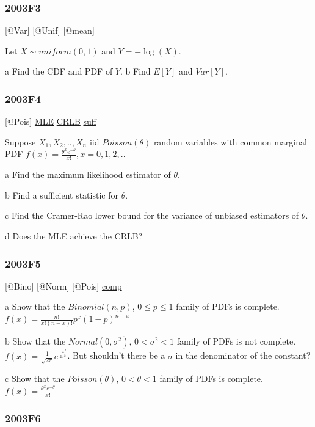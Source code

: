 \documentclass[10pt,twocolumn,portrait]{article}
\begin{document}
\hypertarget{f3-1}{%
\subsubsection{2003F3}\label{f3-1}}

{[}@Var{]} {[}@Unif{]} {[}@mean{]}

Let \(X\sim uniform(0,1)\) and \(Y=-\log(X)\).

a Find the CDF and PDF of \(Y\). b Find \(E[Y]\) and \(Var[Y]\).

\hypertarget{f4-1}{%
\subsubsection{2003F4}\label{f4-1}}

{[}@Pois{]} \protect\hyperlink{MLE}{MLE}
\protect\hyperlink{section-5}{CRLB} \protect\hyperlink{section-6}{suff}

Suppose \(X_1,X_2,..,X_n\) iid \(Poisson(\theta)\) random variables with
common marginal PDF \(f(x)=\frac{\theta^xe^{-\theta}}{x!},x=0,1,2,..\)

a Find the maximum likelihood estimator of \(\theta\).

b Find a sufficient statistic for \(\theta\).

c Find the Cramer-Rao lower bound for the variance of unbiased
estimators of \(\theta\).

d Does the MLE achieve the CRLB?

\hypertarget{f5-1}{%
\subsubsection{2003F5}\label{f5-1}}

{[}@Bino{]} {[}@Norm{]} {[}@Pois{]} \protect\hyperlink{comp}{comp}

a Show that the \(Binomial(n,p)\), \(0\le p\le1\) family of PDFs is
complete. \(f(x)=\frac{n!}{x!(n-x)!}p^x(1-p)^{n-x}\)

b Show that the \(Normal(0,\sigma^2)\), \(0<\sigma^2<1\) family of PDFs
is not complete. \(f(x)=\frac1{\sqrt{2\pi}}e^{\frac{-x^2}{2\sigma^2}}\).
But shouldn't there be a \(\sigma\) in the denominator of the constant?

c Show that the \(Poisson(\theta)\), \(0<\theta<1\) family of PDFs is
complete. \(f(x)=\frac{\theta^xe^{-\theta}}{x!}\)

\hypertarget{f6-1}{%
\subsubsection{2003F6}\label{f6-1}}
\end{document}
